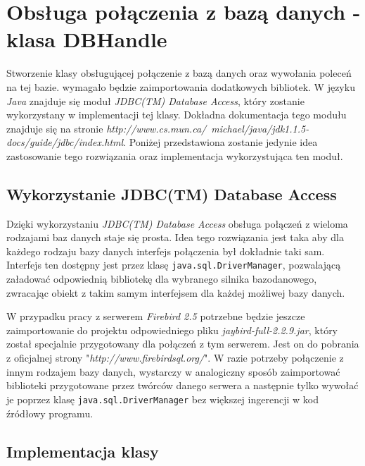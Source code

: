 \section{Obsługa połączenia z bazą danych - klasa DBHandle}

Stworzenie klasy obsługującej połączenie z bazą danych oraz wywołania poleceń na tej bazie. wymagało będzie zaimportowania dodatkowych bibliotek. W języku \emph{Java} znajduje się moduł \emph{ JDBC(TM) Database Access}, który zostanie wykorzystany w implementacji tej klasy. Dokładna dokumentacja tego modułu znajduje się na stronie \emph{http://www.cs.mun.ca/~michael/java/jdk1.1.5-docs/guide/jdbc/index.html}. Poniżej przedstawiona zostanie jedynie idea zastosowanie tego rozwiązania oraz implementacja wykorzystująca ten moduł.
\subsection{Wykorzystanie JDBC(TM) Database Access}

Dzięki wykorzystaniu \emph{ JDBC(TM) Database Access} \cite{Dokumentacja_Jaybird} obsługa połączeń z wieloma rodzajami baz danych staje się prosta. Idea tego rozwiązania jest taka aby dla każdego rodzaju bazy danych interfejs połączenia był dokładnie taki sam. Interfejs ten dostępny jest przez klasę \texttt{java.sql.DriverManager}, pozwalającą załadować odpowiednią bibliotekę dla wybranego silnika bazodanowego, zwracając obiekt z takim samym interfejsem dla każdej możliwej bazy danych. 
\par
W przypadku pracy z serwerem \emph{Firebird 2.5} potrzebne będzie jeszcze zaimportowanie do projektu odpowiedniego pliku \emph{jaybird-full-2.2.9.jar}, który został specjalnie przygotowany dla połączeń z tym serwerem. Jest on do pobrania z oficjalnej strony "\emph{http://www.firebirdsql.org/}". W razie potrzeby połączenie z innym rodzajem bazy danych, wystarczy w analogiczny sposób zaimportować biblioteki przygotowane przez twórców danego serwera a następnie tylko wywołać je poprzez klasę \texttt{java.sql.DriverManager} bez większej ingerencji w kod źródłowy programu.

\subsection{Implementacja klasy}

